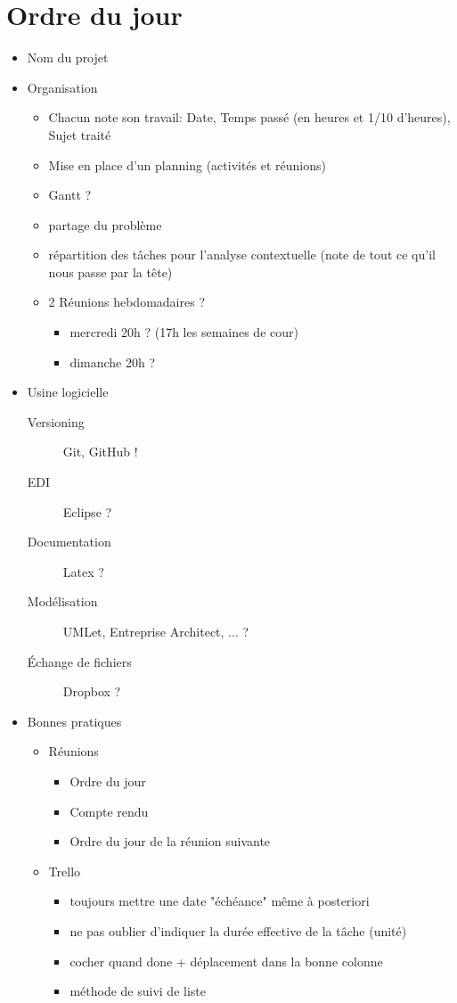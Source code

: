 \documentclass[11pt,a4paper,french,twoside,openright]{article}
\begin{document}
\section{Ordre du jour}
\begin{itemize}
\item Nom du projet
\item Organisation
  \begin{itemize}
  \item Chacun note son travail: Date, Temps passé (en heures et 1/10 d'heures), Sujet traité
  \item Mise en place d'un planning (activités et réunions)
  \item Gantt ?
  \item partage du problème
  \item répartition des tâches pour l'analyse contextuelle (note de tout ce qu'il nous passe par la tête)
  \item 2 Réunions hebdomadaires ?
    \begin{itemize}
    \item mercredi 20h ? (17h les semaines de cour)
    \item dimanche 20h ?
    \end{itemize}
  \end{itemize}
\item Usine logicielle
  \begin{description}
  \item[Versioning] Git, GitHub !
  \item[EDI] Eclipse ?
  \item[Documentation] Latex ?
  \item[Modélisation] UMLet, Entreprise Architect, ... ?
  \item[Échange de fichiers] Dropbox ?
  \end{description}
\item Bonnes pratiques
  \begin{itemize}
  \item Réunions
    \begin{itemize}
    \item Ordre du jour
    \item Compte rendu
    \item Ordre du jour de la réunion suivante
    \end{itemize}
  \item Trello
    \begin{itemize}
    \item toujours mettre une date "échéance" même à posteriori
    \item ne pas oublier d'indiquer la durée effective de la tâche (unité)
    \item cocher quand done + déplacement dans la bonne colonne
    \item méthode de suivi de liste
    \end{itemize}
  \end{itemize}
\end{itemize}
\end{document}
